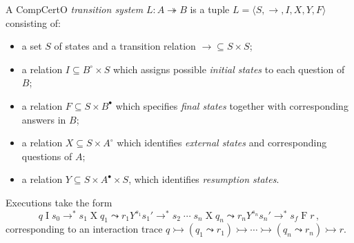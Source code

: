 \documentclass[acmsmall,screen,review,anonymous,nonacm]{acmart}
\newcommand{\kw}[1]{\ensuremath{ \mathsf{#1} }}
\newcommand{\que}{\circ}
\newcommand{\ans}{\bullet}
\begin{document}
A CompCertO \emph{transition system} $L : A \twoheadrightarrow B$
is a tuple $L = \langle S, {\rightarrow}, I, X, Y, F \rangle$
consisting of:
\begin{itemize}
  \item a set $S$ of states and
    a transition relation ${\rightarrow} \subseteq S \times S$;
  \item a relation $I \subseteq B^\que \times S$
    which assigns possible \emph{initial states}
    to each question of $B$;
  \item a relation $F \subseteq S \times B^\ans$
    which specifies \emph{final states} together with
    corresponding answers in $B$;
  \item a relation $X \subseteq S \times A^\que$
    which identifies \emph{external states} and
    corresponding questions of $A$;
  \item a relation $Y \subseteq S \times A^\ans \times S$,
    which identifies \emph{resumption states}.
\end{itemize}
Executions take the form
\[
  q \mathrel{I} s_0 \rightarrow^*
  s_1 \mathrel{X} q_1 \leadsto
  r_1 \mathrel{Y^{s_1}} s_1' \rightarrow^*
  s_2 \mathrel{\cdots}
  s_n \mathrel{X} q_n \leadsto
  r_n \mathrel{Y^{s_n}} s_n' \rightarrow^*
  s_f \mathrel{F} r
  \,,
\]
corresponding to an interaction trace
$
  q \rightarrowtail
  (q_1 \leadsto r_1) \rightarrowtail
  \cdots \rightarrowtail
  (q_n \leadsto r_n) \rightarrowtail
  r
$.


\end{document}
